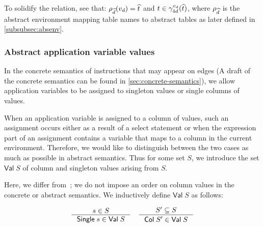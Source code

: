 To solidify the relation, see that: $\rho_{\widehat{d}}(v_d) = \widehat{t}$ and $t \in \gamma_{4d}^{v_d}(\widehat{t})$, where $\rho_{\widehat{d}}$ is the abstract environment mapping table names to abstract tables as later defined in \autoref{subsubsec:absenv}.

\subsubsection{Abstract application variable values}
In the concrete semantics of instructions that may appear on edges (A draft of the concrete semantics can be found in \autoref{sec:concrete-semantics}), we allow application variables to be assigned to singleton values or single columns of values.

When an application variable is assigned to a column of values, such an assignment occurs either as a result of a select statement or when the expression part of an assignment contains a variable that maps to a column in the current environment.
Therefore, we would like to distinguish between the two cases as much as possible in abstract semantics.
Thus for some set $S$, we introduce the set $\mathsf{Val} \; S$ of column and singleton values arising from $S$.

Here, we differ from~\cite{halder_abstract_2012}; we do not impose an order on column values in the concrete or abstract semantics.
We inductively define $\mathsf{Val} \; S$ as follows:

\begin{gather*}
    \inference{s \in S}{\mathsf{Single} \; s \in \mathsf{Val} \; S} \quad
    \inference{S' \subseteq S}{\mathsf{Col} \; S' \in \mathsf{Val} \; S}
\end{gather*}


